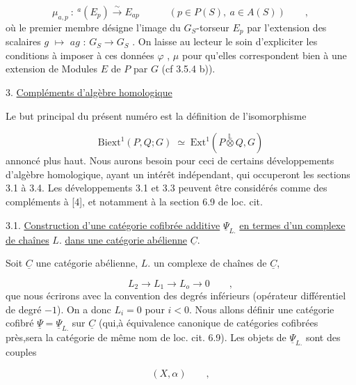 \begin{equation*}
\mu_{a,p} \ :\ {}^a(E_p) \overset{\sim}{\longrightarrow} E_{ap} \qquad\quad (p \in P(S),\ a \in A(S)) \qquad ,
\end{equation*}
où le premier  membre désigne l'image du $G_S$-torseur $E_p$ par l'extension
des scalaires $g$ $\longmapsto$ $ag$ : $G_S \longrightarrow G_S$ . On laisse au lecteur le soin d'expliciter les conditions à imposer à ces données $\varphi$ , $\mu$ pour qu'elles correspondent bien à une extension de Modules $E$ de $P$ par $G$  (cf 3.5.4 b)).


3. \underline{Compléments d'algèbre homologique}

Le but principal du présent numéro est la définition de l'isomorphisme

\begin{equation*}
\mathrm{Biext}^1(P,Q;G) \;\simeq\; \mathrm{Ext}^1(P \overset{\mathbb{L}}{\otimes} Q,G)
\end{equation*}
annoncé plus haut. Nous aurons besoin pour ceci de certains développements d'algèbre homologique, ayant un intérêt indépendant, qui occuperont les sections 3.1  à 3.4. Les développements 3.1 et 3.3 peuvent être considérés comme des compléments à [4], et notamment à la section 6.9 de loc. cit.


3.1.  \underline{Construction d'une catégorie cofibrée additive} $\underline{\Psi}_{L.}$ \underline{en termes d'un complexe de chaînes} $L.$ \underline{dans une catégorie abélienne} $\underline{C}$.

Soit $\underline{C}$ une catégorie abélienne, $L.$ un complexe de chaînes de $\underline{C}$,

\begin{equation}\tag{3.1.1}
L_2 \longrightarrow L_1 \longrightarrow L_o \longrightarrow 0 \qquad ,
\end{equation}
que nous écrirons avec la convention des degrés inférieurs (opérateur différentiel de degré $-1$). On a donc $L_i = 0$ pour $i < 0$. Nous allons définir une catégorie cofibré $\underline{\Psi} = \underline{\Psi}_{L.}$ sur $\underline{C}$ (qui,à équivalence canonique de catégories cofibrées près,sera la catégorie de même nom de loc. cit. 6.9). Les objets de $\underline{\Psi}_{L.}$ sont des couples

\begin{equation*}
(X , \alpha) \qquad , 
\end{equation*}



